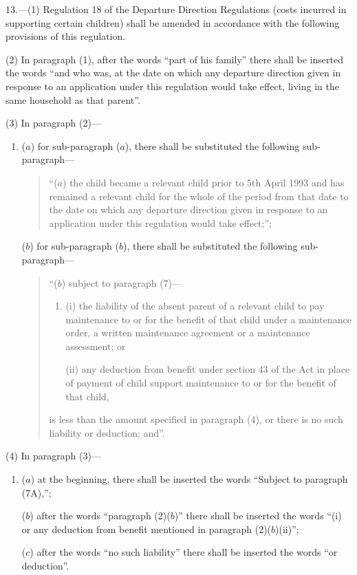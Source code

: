 \documentclass[12pt,a4paper]{article}
\begin{document}
13.—(1) Regulation 18 of the Departure Direction Regulations (costs incurred in supporting certain children) shall be amended in accordance with the following provisions of this regulation.

(2) In paragraph (1), after the words “part of his family” there shall be inserted the words “and who was, at the date on which any departure direction given in response to an application under this regulation would take effect, living in the same household as that parent”.

(3) In paragraph (2)—
\begin{enumerate}\item[]
($a$) for sub-paragraph ($a$), there shall be substituted the following sub-paragraph—
\begin{quotation}
“($a$) the child became a relevant child prior to 5th April 1993 and has remained a relevant child for the whole of the period from that date to the date on which any departure direction given in response to an application under this regulation would take effect;”;
\end{quotation}

($b$) for sub-paragraph ($b$), there shall be substituted the following sub-paragraph—
\begin{quotation}
“($b$) subject to paragraph (7)—
\begin{enumerate}\item[]
(i) the liability of the absent parent of a relevant child to pay maintenance to or for the benefit of that child under a maintenance order, a written maintenance agreement or a maintenance assessment; or

(ii) any deduction from benefit under section 43 of the Act in place of payment of child support maintenance to or for the benefit of that child,
\end{enumerate}
is less than the amount specified in paragraph (4), or there is no such liability or deduction; and”.
\end{quotation}
\end{enumerate}

(4) In paragraph (3)—
\begin{enumerate}\item[]
($a$) at the beginning, there shall be inserted the words “Subject to paragraph (7A),”;

($b$) after the words “paragraph (2)($b$)” there shall be inserted the words “(i) or any deduction from benefit mentioned in paragraph (2)($b$)(ii)”;

($c$) after the words “no such liability” there shall be inserted the words “or deduction”.
\end{enumerate}
\end{document}
